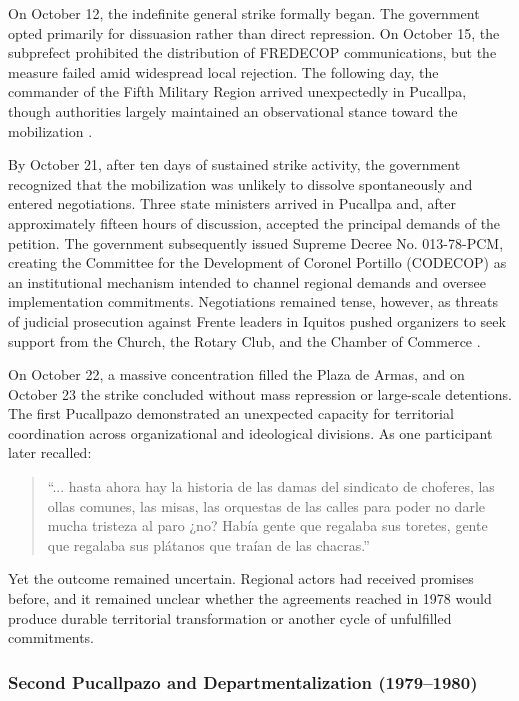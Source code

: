 \documentclass[12pt]{article}
\begin{document}
On October 12, the indefinite general strike formally began. The government opted primarily for dissuasion rather than direct repression. On October 15, the subprefect prohibited the distribution of FREDECOP communications, but the measure failed amid widespread local rejection. The following day, the commander of the Fifth Military Region arrived unexpectedly in Pucallpa, though authorities largely maintained an observational stance toward the mobilization \parencite{tapuya_huaman_documental_2024}.

By October 21, after ten days of sustained strike activity, the government recognized that the mobilization was unlikely to dissolve spontaneously and entered negotiations. Three state ministers arrived in Pucallpa and, after approximately fifteen hours of discussion, accepted the principal demands of the petition. The government subsequently issued Supreme Decree No. 013-78-PCM, creating the Committee for the Development of Coronel Portillo (CODECOP) as an institutional mechanism intended to channel regional demands and oversee implementation commitments. Negotiations remained tense, however, as threats of judicial prosecution against Frente leaders in Iquitos pushed organizers to seek support from the Church, the Rotary Club, and the Chamber of Commerce \parencite{tapuya_huaman_documental_2024}.

On October 22, a massive concentration filled the Plaza de Armas, and on October 23 the strike concluded without mass repression or large-scale detentions. The first Pucallpazo demonstrated an unexpected capacity for territorial coordination across organizational and ideological divisions. As one participant later recalled:

\begin{quote}
``... hasta ahora hay la historia de las damas del sindicato de choferes, las ollas comunes, las misas, las orquestas de las calles para poder no darle mucha tristeza al paro ¿no? Había gente que regalaba sus toretes, gente que regalaba sus plátanos que traían de las chacras.'' 
\parencite{rengifo_interview_2022}
\end{quote}

Yet the outcome remained uncertain. Regional actors had received promises before, and it remained unclear whether the agreements reached in 1978 would produce durable territorial transformation or another cycle of unfulfilled commitments.
 
\subsubsection{Second Pucallpazo and Departmentalization (1979--1980)}
\end{document}
